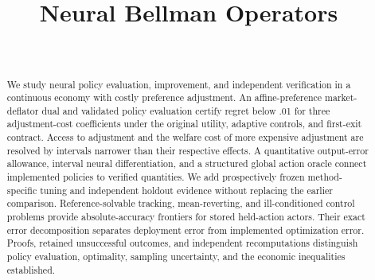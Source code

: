 \documentclass[ecta]{econsocart}
\theoremstyle{remark}
\begin{document}
\begin{frontmatter}
\title{Neural Bellman Operators}
\begin{aug}
\author[id=au1,addressref={add1}]{~}
\address[id=add1]{}
\end{aug}
\begin{abstract}
We study neural policy evaluation, improvement, and independent verification in a continuous economy with costly preference adjustment. An affine-preference market-deflator dual and validated policy evaluation certify regret below .01 for three adjustment-cost coefficients under the original utility, adaptive controls, and first-exit contract. Access to adjustment and the welfare cost of more expensive adjustment are resolved by intervals narrower than their respective effects. A quantitative output-error allowance, interval neural differentiation, and a structured global action oracle connect implemented policies to verified quantities. We add prospectively frozen method-specific tuning and independent holdout evidence without replacing the earlier comparison. Reference-solvable tracking, mean-reverting, and ill-conditioned control problems provide absolute-accuracy frontiers for stored held-action actors. Their exact error decomposition separates deployment error from implemented optimization error. Proofs, retained unsuccessful outcomes, and independent recomputations distinguish policy evaluation, optimality, sampling uncertainty, and the economic inequalities established.
\end{abstract}
\begin{keyword}
\end{keyword}
\end{frontmatter}

\begin{appendix}




\end{appendix}

\end{document}
